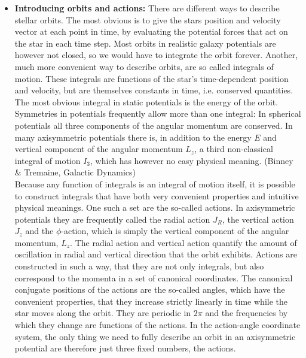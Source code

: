 \begin{itemize}
\item \textbf{Introducing orbits and actions:} There are different ways to describe stellar orbits. The most obvious is to give the stars position and velocity vector at each point in time, by evaluating the potential forces that act on the star in each time step. Most orbits in realistic galaxy potentials  are however not closed, so we would have to integrate the orbit forever. Another, much more convenient way to describe orbits, are so called integrals of motion. These integrals are functions of the star's time-dependent position and velocity, but are themselves constants in time, i.e. conserved quantities. The most obvious integral in static potentials is the energy of the orbit. Symmetries in potentials frequently allow more than one integral: In spherical potentials all three components of the angular momentum are conserved. In many axisymmetric potentials there is, in addition to the energy $E$ and vertical component of the angular momentum $L_z$, a third non-classical integral of motion $I_3$, which has however no easy physical meaning.  (Binney \& Tremaine, Galactic Dynamics)\\
Because any function of integrals is an integral of motion itself, it is possible to construct integrals that have both very convenient properties and intuitive physical meanings. One such a set are the so-called actions. In axisymmetric potentials they are frequently called the radial action $J_R$, the vertical action $J_z$ and the $\phi$-action, which is simply the vertical component of the angular momentum, $L_z$. The radial action and vertical action quantify the amount of oscillation in radial and vertical direction that the orbit exhibits.  Actions are constructed in such a way, that they are not only integrals, but also correspond to the momenta in a set of canonical coordinates. The canonical conjugate positions of the actions are the so-called angles, which have the convenient properties, that they increase strictly linearly in time while the star moves along the orbit. They are periodic in $2\pi$ and the frequencies by which they change are functions of the actions. In the action-angle coordinate system, the only thing we need to fully describe an orbit in an axisymmetric potential are therefore just three fixed numbers, the actions. 


\end{itemize}
